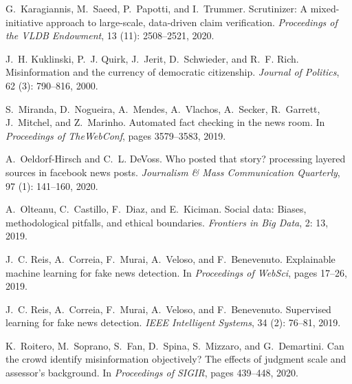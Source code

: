 \documentclass[11pt]{article}
\begin{document}
\begin{thebibliography}{10}
\begin{small}
G.~Karagiannis, M.~Saeed, P.~Papotti, and I.~Trummer.
\newblock Scrutinizer: A mixed-initiative approach to large-scale, data-driven
claim verification.
\newblock \emph{Proceedings of the VLDB Endowment}, 13 (11):
2508--2521, 2020.

J.~H. Kuklinski, P.~J. Quirk, J.~Jerit, D.~Schwieder, and R.~F. Rich.
\newblock Misinformation and the currency of democratic citizenship.
\newblock \emph{Journal of Politics}, 62 (3): 790--816, 2000.

S.~Miranda, D.~Nogueira, A.~Mendes, A.~Vlachos, A.~Secker, R.~Garrett,
J.~Mitchel, and Z.~Marinho.
\newblock Automated fact checking in the news room.
\newblock In \emph{Proceedings of TheWebConf}, pages 3579--3583, 2019.

A.~Oeldorf-Hirsch and C.~L. DeVoss.
\newblock Who posted that story? processing layered sources in facebook news
posts.
\newblock \emph{Journalism \& Mass Communication Quarterly}, 97
(1): 141--160, 2020.

A.~Olteanu, C.~Castillo, F.~Diaz, and E.~Kiciman.
\newblock Social data: Biases, methodological pitfalls, and ethical boundaries.
\newblock \emph{Frontiers in Big Data}, 2: 13, 2019.

J.~C. Reis, A.~Correia, F.~Murai, A.~Veloso, and F.~Benevenuto.
\newblock Explainable machine learning for fake news detection.
\newblock In \emph{Proceedings of WebSci}, pages 17--26, 2019{}.

J.~C. Reis, A.~Correia, F.~Murai, A.~Veloso, and F.~Benevenuto.
\newblock Supervised learning for fake news detection.
\newblock \emph{IEEE Intelligent Systems}, 34 (2): 76--81,
2019{}.

K.~Roitero, M.~Soprano, S.~Fan, D.~Spina, S.~Mizzaro, and G.~Demartini.
\newblock Can the crowd identify misinformation objectively? {T}he effects of
judgment scale and assessor's background.
\newblock In \emph{Proceedings of SIGIR}, pages 439--448, 2020{}.


\end{small}
\end{thebibliography}
\end{document}
